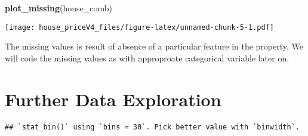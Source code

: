 \documentclass[
]{article}
\newenvironment{Shaded}{\begin{snugshade}}{\end{snugshade}}
\newcommand{\CommentTok}[1]{\textcolor[rgb]{0.56,0.35,0.01}{\textit{#1}}}
\newcommand{\DataTypeTok}[1]{\textcolor[rgb]{0.13,0.29,0.53}{#1}}
\newcommand{\KeywordTok}[1]{\textcolor[rgb]{0.13,0.29,0.53}{\textbf{#1}}}
\newcommand{\NormalTok}[1]{#1}
\newcommand{\OperatorTok}[1]{\textcolor[rgb]{0.81,0.36,0.00}{\textbf{#1}}}
\newcommand{\StringTok}[1]{\textcolor[rgb]{0.31,0.60,0.02}{#1}}
\begin{document}
\begin{Shaded}
\begin{Highlighting}[]
\KeywordTok{plot_missing}\NormalTok{(house_comb)}
\end{Highlighting}
\end{Shaded}

\texttt{[image: house\_priceV4\_files/figure-latex/unnamed-chunk-5-1.pdf]}

The missing values is result of absence of a particular feature in the
property. We will code the missing values as with approproate
categorical variable later on.

\hypertarget{further-data-exploration}{%
\section{Further Data Exploration}\label{further-data-exploration}}

\begin{Shaded}
\end{Shaded}

\begin{verbatim}
## `stat_bin()` using `bins = 30`. Pick better value with `binwidth`.
\end{verbatim}
\end{document}
